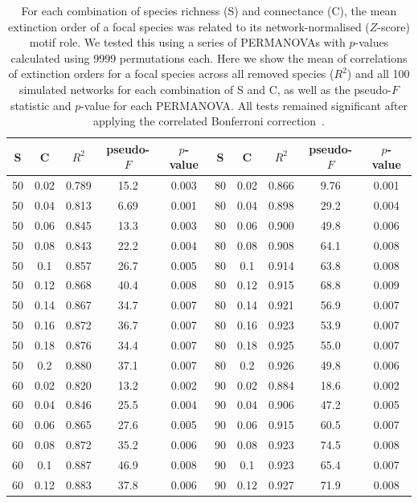 \documentclass[12pt]{article}
\begin{document}
\begin{spacing}{2.0}
		\begin{table}[hb!]
			\caption{For each combination of species richness (S) and connectance (C), the mean extinction order of a focal species was related to its network-normalised ($Z$-score) motif role. We tested this using a series of PERMANOVAs with $p$-values calculated using 9999 permutations each. Here we show the mean of correlations of extinction orders for a focal species across all removed species ($R^2$) and all 100 simulated networks for each combination of S and C, as well as the pseudo-$F$ statistic and $p$-value for each PERMANOVA. All tests remained significant after applying the correlated Bonferroni correction~\citep{Drezner2016}.}
			\label{permtable_Z}
			\begin{tabular}{c c | c | c c ||c c | c | c c |}
				S	&	C	&	$R^2$	&	pseudo-$F$	&	$p$-value	&	S	&	C &	$R^2$	&	pseudo-$F$	&	$p$-value\\ 
				\hline
                50&0.02&0.789&15.2&0.003	&	80&0.02&0.866&9.76&0.001\\
                50&0.04&0.813&6.69&0.001	&	80&0.04&0.898&29.2&0.004\\
                50&0.06&0.845&13.3&0.003	&	80&0.06&0.900&49.8&0.006\\
                50&0.08&0.843&22.2&0.004	&	80&0.08&0.908&64.1&0.008\\
                50&0.1&0.857&26.7&0.005	&	80&0.1&0.914&63.8&0.008\\
                50&0.12&0.868&40.4&0.008	&	80&0.12&0.915&68.8&0.009\\
                50&0.14&0.867&34.7&0.007	&	80&0.14&0.921&56.9&0.007\\
                50&0.16&0.872&36.7&0.007	&	80&0.16&0.923&53.9&0.007\\
                50&0.18&0.876&34.4&0.007	&	80&0.18&0.925&55.0&0.007\\
                50&0.2&0.880&37.1&0.007	&	80&0.2&0.926&49.8&0.006\\
                60&0.02&0.820&13.2&0.002	&	90&0.02&0.884&18.6&0.002\\
                60&0.04&0.846&25.5&0.004	&	90&0.04&0.906&47.2&0.005\\
                60&0.06&0.865&27.6&0.005	&	90&0.06&0.915&60.5&0.007\\
                60&0.08&0.872&35.2&0.006	&	90&0.08&0.923&74.5&0.008\\
                60&0.1&0.887&46.9&0.008	&	90&0.1&0.923&65.4&0.007\\
                60&0.12&0.883&37.8&0.006	&	90&0.12&0.927&71.9&0.008\\

\end{tabular}
\end{table}
\end{spacing}
\end{document}
